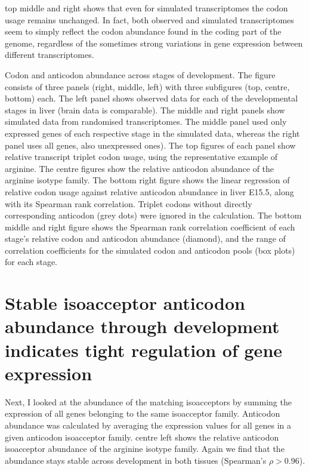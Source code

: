  top middle and right shows that even for
simulated transcriptomes the codon usage remains unchanged. In fact, both
observed and simulated transcriptomes seem to simply reflect the codon abundance
found in the coding part of the genome, regardless of the sometimes strong
variations in gene expression between different transcriptomes.

    {Codon and anticodon abundance across stages of development.}
    {The figure consists of three panels (right, middle, left) with three
    subfigures (top, centre, bottom) each. The left panel shows observed data
    for each of the developmental stages in liver (brain data is comparable).
    The middle and right panels show simulated data from randomised
    transcriptomes. The middle panel used only expressed genes of each
    respective stage in the simulated data, whereas the right panel uses all
    genes, also unexpressed ones). The top figures of each panel show relative
    \mrna transcript triplet codon usage, using the representative example of
    arginine. The centre figures show the relative \trna anticodon abundance of
    the arginine isotype family. The bottom right figure shows the linear
    regression of relative codon usage against relative anticodon abundance in
    liver E15.5, along with its Spearman rank correlation. Triplet codons
    without directly corresponding anticodon (grey dots) were ignored in the
    calculation. The bottom middle and right figure shows the Spearman rank
    correlation coefficient of each stage’s relative codon and anticodon
    abundance (diamond), and the range of correlation coefficients for the
    simulated codon and anticodon pools (box plots) for each stage.}

\section{Stable isoacceptor anticodon abundance through development indicates
tight regulation of  gene expression}

Next, I looked at the abundance of the matching \trna isoacceptors by summing
the expression of all \trna genes belonging to the same isoacceptor family.
Anticodon abundance was calculated by averaging the expression values for all
\trna genes in a given anticodon isoacceptor family.
 centre left shows the relative anticodon
isoacceptor abundance of the arginine isotype family. Again we find that the
abundance stays stable across development in both tissues (Spearman’s \(\rho >
0.96\)).

